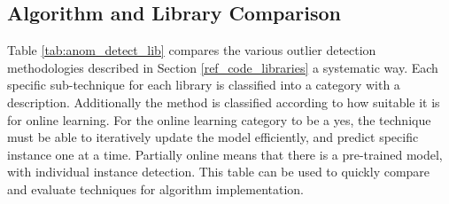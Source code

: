 \subsection{Algorithm and Library Comparison}

Table \ref{tab:anom_detect_lib} compares the various outlier detection methodologies described in Section \ref{ref_code_libraries} a systematic way. Each specific sub-technique for each library is classified into a category with a description. Additionally the method is classified according to how suitable it is for online learning. For the online learning category to be a yes, the technique must be able to iteratively update the model efficiently, and predict specific instance one at a time. Partially online means that there is a pre-trained model, with individual instance detection. This table can be used to quickly compare and evaluate techniques for algorithm implementation.


